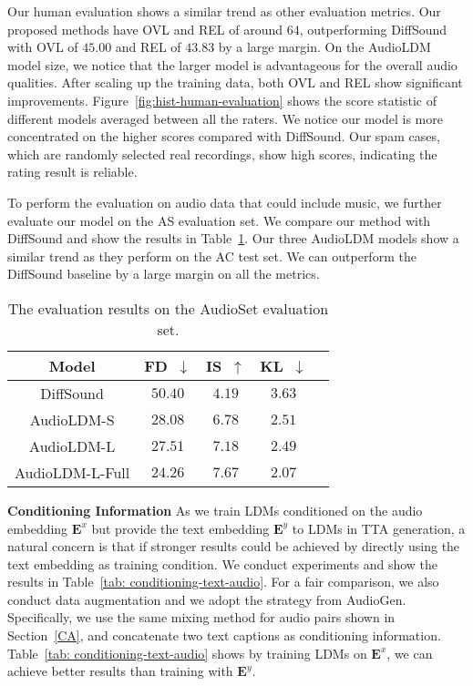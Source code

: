 \documentclass{article}
\begin{document}
Our human evaluation shows a similar trend as other evaluation metrics. Our proposed methods have OVL and REL of around $64$, outperforming DiffSound with OVL of $45.00$ and REL of $43.83$ by a large margin. On the AudioLDM model size, we notice that the larger model is advantageous for the overall audio qualities. After scaling up the training data, both OVL and REL show significant improvements.
Figure~\ref{fig:hist-human-evaluation} shows the score statistic of different models averaged between all the raters. We notice our model is more concentrated on the higher scores compared with DiffSound. Our spam cases, which are randomly selected real recordings, show high scores, indicating the rating result is reliable.



To perform the evaluation on audio data that could include music, we further evaluate our model on the AS evaluation set. We compare our method with DiffSound and show the results in Table~\ref{tab: AudioSetResults}. Our three AudioLDM models show a similar trend as they perform on the AC test set. We can outperform the DiffSound baseline by a large margin on all the metrics. 

\begin{table}[htbp]
\small
\centering
\begin{tabular}{ccccc}
\toprule
       Model            & FD~$\downarrow$   & IS~$\uparrow$   & KL~$\downarrow$  \\
\midrule
DiffSound          & $50.40$ & $4.19$  & $3.63$ \\
AudioLDM-S      & $28.08$ & $6.78$ & $2.51$  \\
AudioLDM-L      & $27.51$ & $7.18$ & $2.49$ \\
AudioLDM-L-Full & $\mathbf{24.26}$ & $\mathbf{7.67}$ & $\mathbf{2.07}$ \\
\bottomrule
\end{tabular}
\caption{The evaluation results on the AudioSet evaluation set.}
\label{tab: AudioSetResults}
\end{table}



\textbf{Conditioning Information}
As we train LDMs conditioned on the audio embedding $\boldsymbol{E}^{x}$ but provide the text embedding $\boldsymbol{E}^{y}$ to LDMs in TTA generation, a natural concern is that if stronger results could be achieved by directly using the text embedding as training condition. We conduct experiments and show the results in Table~\ref{tab: conditioning-text-audio}. For a fair comparison, we also conduct data augmentation and we adopt the strategy from AudioGen. Specifically, we use the same mixing method for audio pairs shown in Section~\ref{CA}, and concatenate two text captions as conditioning information. Table~\ref{tab: conditioning-text-audio} shows by training LDMs on $\boldsymbol{E}^{x}$, we can achieve better results than training with $\boldsymbol{E}^{y}$. 
\end{document}
